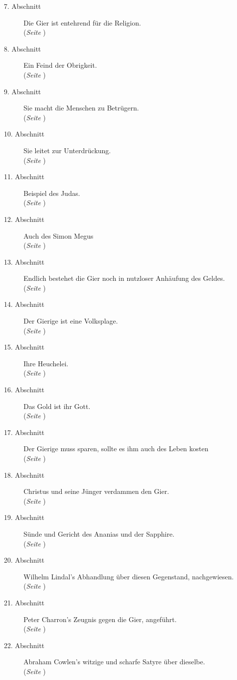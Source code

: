 \begin{description}
\item[7. Abschnitt] Die Gier ist entehrend für die Religion.
\\(\textit{Seite \pageref{kap13_ab7}})
\item[8. Abschnitt] Ein Feind der Obrigkeit.
\\(\textit{Seite \pageref{kap13_ab8}})
\item[9. Abschnitt] Sie macht die Menschen zu Betrügern.
\\(\textit{Seite \pageref{kap13_ab9}})
\item[10. Abschnitt] Sie leitet zur Unterdrückung.
\\(\textit{Seite \pageref{kap13_ab10}})
\item[11. Abschnitt] Beispiel des Judas.
\\(\textit{Seite \pageref{kap13_ab11}})
\item[12. Abschnitt] Auch des Simon Megus
\\(\textit{Seite \pageref{kap13_ab12}})
\item[13. Abschnitt] Endlich bestehet die Gier noch in nutzloser Anhäufung des
Geldes.
\\(\textit{Seite \pageref{kap13_ab13}})
\item[14. Abschnitt] Der Gierige ist eine Volksplage.
\\(\textit{Seite \pageref{kap13_ab14}})
\item[15. Abschnitt] Ihre Heuchelei.
\\(\textit{Seite \pageref{kap13_ab15}})
\item[16. Abschnitt] Das Gold ist ihr Gott.
\\(\textit{Seite \pageref{kap13_ab16}})
\item[17. Abschnitt] Der Gierige muss sparen, sollte es ihm auch des Leben kosten
\\(\textit{Seite \pageref{kap13_ab17}})
\item[18. Abschnitt] Christus und seine Jünger verdammen den Gier.
\\(\textit{Seite \pageref{kap13_ab18}})
\item[19. Abschnitt] Sünde und Gericht des Ananias und der Sapphire.
\\(\textit{Seite \pageref{kap13_ab19}})
\item[20. Abschnitt] Wilhelm Lindal's Abhandlung über diesen Gegenstand,
nachgewiesen.
\\(\textit{Seite \pageref{kap13_ab20}})
\item[21. Abschnitt] Peter Charron's Zeugnis gegen die Gier, angeführt.
\\(\textit{Seite \pageref{kap13_ab21}})
\item[22. Abschnitt] Abraham Cowlen's witzige und scharfe Satyre über dieselbe.
\\(\textit{Seite \pageref{kap13_ab22}})

\end{description}

